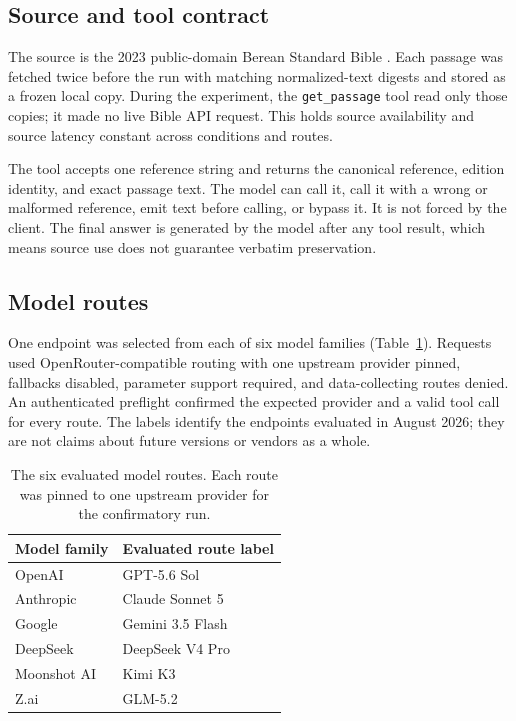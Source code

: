 \documentclass[11pt]{article}
\begin{document}
\subsection{Source and tool contract}

The source is the 2023 public-domain Berean Standard Bible
\citep{berean2023license}. Each passage was fetched twice before the run with
matching normalized-text digests and stored as a frozen local copy. During the
experiment, the \texttt{get\_passage} tool read only those copies; it made no
live Bible API request. This holds source availability and source latency
constant across conditions and routes.

The tool accepts one reference string and returns the canonical reference,
edition identity, and exact passage text. The model can call it, call it with a
wrong or malformed reference, emit text before calling, or bypass it. It is not
forced by the client. The final answer is generated by the model after any
tool result, which means source use does not guarantee verbatim preservation.

\subsection{Model routes}

One endpoint was selected from each of six model families
(Table~\ref{tab:routes}). Requests used OpenRouter-compatible routing with one
upstream provider pinned, fallbacks disabled, parameter support required, and
data-collecting routes denied. An authenticated preflight confirmed the expected
provider and a valid tool call for every route. The labels identify the
endpoints evaluated in August 2026; they are not claims about future versions or
vendors as a whole.

\begin{table}[!ht]
\centering
\small
\begin{tabular}{ll}
\toprule
\textbf{Model family} & \textbf{Evaluated route label} \\
\midrule
OpenAI & GPT-5.6 Sol \\
Anthropic & Claude Sonnet 5 \\
Google & Gemini 3.5 Flash \\
DeepSeek & DeepSeek V4 Pro \\
Moonshot AI & Kimi K3 \\
Z.ai & GLM-5.2 \\
\bottomrule
\end{tabular}
\caption{The six evaluated model routes. Each route was pinned to one upstream
provider for the confirmatory run.}
\label{tab:routes}
\end{table}
\end{document}
